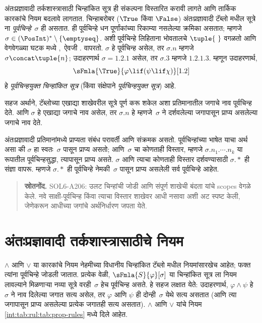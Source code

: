 अंतःप्रज्ञावादी तर्कशास्त्रासाठी
चिन्हांकित सूत्र ही संकल्पना
विस्तारित करावी लागते आणि
तार्किक कारकांचे नियम बदलावे लागतात.
चिन्हाबरोबर ($\True$ किंवा
$\False$) अंतःप्रज्ञावादी
टॅब्लो मधील सूत्रे ना
\emph{पूर्वचिन्हे}~$\sigma$ ही असतात.
ही पूर्वचिन्हे धन पूर्णांकांच्या
रिकाम्या नसलेल्या क्रमिका असतात;
म्हणजे $\sigma \in
(\PosInt)^* \setminus \{\emptyseq\}$.
अशी पूर्वचिन्हे लिहिताना
भोवतालचे $\tuple{\ }$ वगळतो
आणि वेगवेगळ्या घटक मध्ये
$,$ ऐवजी $.$ वापरतो.
$\sigma$ हे पूर्वचिन्ह असेल,
तर $\sigma.n$ म्हणजे
$\sigma \concat \tuple{n}$;
उदाहरणार्थ $\sigma = 1.2.1$
असेल, तर $\sigma.3$ म्हणजे
$1.2.1.3$. म्हणून उदाहरणार्थ,
\[
\sFmla{\True}{\varphi \lif (\psi \lif \chi)}[1.2]
\]
हे \emph{पूर्वचिन्हयुक्त
चिन्हांकित सूत्र} (किंवा संक्षेपाने
\emph{पूर्वचिन्हयुक्त सूत्र})
आहे.

सहज अर्थाने, टॅब्लोच्या
एखाद्या शाखेवरील सूत्रे
पूर्ण करू शकेल अशा प्रतिमानातील
जगाचे नाव पूर्वचिन्ह देते.
आणि $\sigma$ हे एखाद्या जगाचे
नाव असेल, तर $\sigma.n$ हे
म्हणजे~$\sigma$ ने दर्शवलेल्या
जगापासून प्राप्य असलेल्या
जगाचे नाव देते.

अंतःप्रज्ञावादी प्रतिमानांमध्ये
प्राप्यता संबंध परावर्ती आणि
संक्रमक असतो. पूर्वचिन्हांच्या
भाषेत याचा अर्थ असा की
$\sigma$ हा स्वतः~$\sigma$ पासून प्राप्य
असतो; आणि~$\sigma$ चा कोणताही
विस्तार, म्हणजे
$\sigma.n_1.\cdots.n_k$
या रूपातील पूर्वचिन्हसुद्धा,
त्यापासून प्राप्य असते.
$\sigma$ आणि त्याचा कोणताही
विस्तार दर्शवण्यासाठी
$\sigma.*$ ही संज्ञा वापरू.
म्हणजे $\sigma.*$ ही पूर्वचिन्हे
नेमकी~$\sigma$ पासून प्राप्य
असलेली सर्व पूर्वचिन्हे आहेत.






\begin{quote}\small\textbf{स्रोतनोंद.} SOL6-A206: उलट चिन्हांची जोडी आणि संपूर्ण शाखेची बंदता यांचे scopes वेगळे केले. नवे साक्षी-पूर्वचिन्ह किंवा त्याचा विस्तार शाखेवर आधी नसावा अशी अट स्पष्ट केली, जेणेकरून आधीच्या जगांचे अर्थनिर्धारण जपता येते.\end{quote}






\section{अंतःप्रज्ञावादी तर्कशास्त्रासाठीचे नियम}\label{int:tab:rul:sec}

$\land$ आणि $\lor$ या कारकांचे नियम नेहमीच्या विधानीय
चिन्हांकित टॅब्लो मधील नियमांसारखेच आहेत;
फक्त त्यांना पूर्वचिन्हे जोडली जातात. प्रत्येक वेळी,
$\sFmla{S}{\varphi}[\sigma]$ या चिन्हांकित सूत्र
ला नियम लावल्याने मिळणाऱ्या नव्या सूत्रे
वरही~$\sigma$ हेच पूर्वचिन्ह असते. हे सहज लक्षात
येते: उदाहरणार्थ, $\varphi \land \psi$ हे~$\sigma$ ने
नाव दिलेल्या जगात सत्य असेल, तर $\varphi$ आणि $\psi$
ही दोन्ही~$\sigma$ येथे सत्य असतात (आणि त्या
जगापासून प्राप्य असलेल्या प्रत्येक जगातही सत्य
असतात). $\land$ आणि $\lor$ यांचे नियम
\ref{int:tab:rul:tab:prop-rules} मध्ये दिले आहेत.

